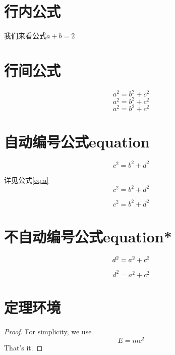 \documentclass{article}
\begin{document}
    

\section{行内公式} %
    我们来看公式$a+b=2$ %

\section{行间公式}
    \[a^2 = b ^2 + c^2 \tag{*}\] %
    $$a^2 = b ^2 + c^2 $$
    \begin{displaymath}
    a^2 = b ^2 + c^2
    \end{displaymath}

\section{自动编号公式equation}
    \begin{equation} %
     c^2 = b ^2 + d^2 
    \end{equation}

    详见公式\ref{eq:a}
    \begin{equation} 
    c^2 = b ^2 + d^2 \label{eq:a}
    \end{equation}

    \begin{equation} 
     c^2 = b ^2 + d^2 \tag{*} 
    \end{equation}

\section{不自动编号公式equation*}  
    \begin{equation}
    d^2 = a ^2 + c^2 \notag
    \end{equation}
    
    \begin{equation*}
    d^2 = a ^2 + c^2 
    \end{equation*}

\section{定理环境}
    \begin{proof}
    For simplicity, we use
    \[
    E=mc^2
    \]
    That's it.
    \end{proof}
\end{document}
